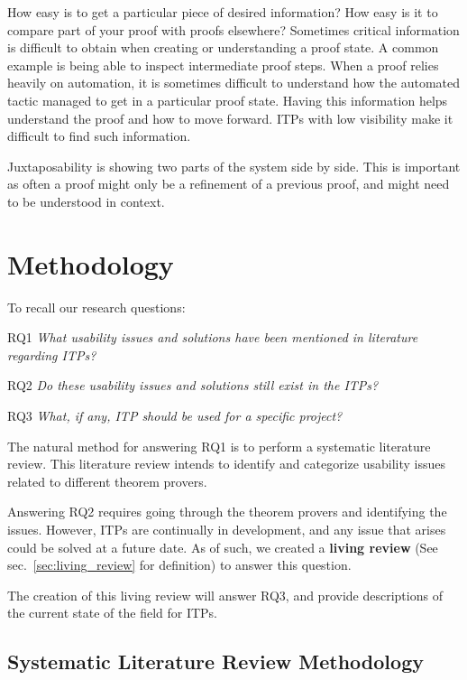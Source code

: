 \documentclass[
]{article}
\begin{document}
How easy is to get a particular piece of desired information? How easy
is it to compare part of your proof with proofs elsewhere? Sometimes
critical information is difficult to obtain when creating or
understanding a proof state. A common example is being able to inspect
intermediate proof steps. When a proof relies heavily on automation, it
is sometimes difficult to understand how the automated tactic managed to
get in a particular proof state. Having this information helps
understand the proof and how to move forward. ITPs with low visibility
make it difficult to find such information.

Juxtaposability is showing two parts of the system side by side. This is
important as often a proof might only be a refinement of a previous
proof, and might need to be understood in context.

\hypertarget{methodology}{%
\section{Methodology}\label{methodology}}

To recall our research questions:

RQ1 \emph{What usability issues and solutions have been mentioned in
literature regarding ITPs?}

RQ2 \emph{Do these usability issues and solutions still exist in the
ITPs?}

RQ3 \emph{What, if any, ITP should be used for a specific project?}

The natural method for answering RQ1 is to perform a systematic
literature review. This literature review intends to identify and
categorize usability issues related to different theorem provers.

Answering RQ2 requires going through the theorem provers and identifying
the issues. However, ITPs are continually in development, and any issue
that arises could be solved at a future date. As of such, we created a
\textbf{living review} (See sec.~\ref{sec:living_review} for definition)
to answer this question.

The creation of this living review will answer RQ3, and provide
descriptions of the current state of the field for ITPs.

\hypertarget{sec:review_methodology}{%
\subsection{Systematic Literature Review
Methodology}\label{sec:review_methodology}}
\end{document}
